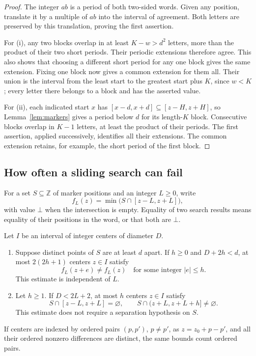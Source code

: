 \begin{proof}
The integer $ab$ is a period of both two-sided words.  Given any position,
translate it by a multiple of $ab$ into the interval of agreement.  Both
letters are preserved by this translation, proving the first assertion.

For (i), any two blocks overlap in at least $K-w>d^2$ letters, more than
the product of their two short periods.  Their periodic extensions
therefore agree.  This also shows that choosing a different short period
for any one block gives the same extension.  Fixing one block now gives
a common extension for them all.  Their union is the interval from the
least start to the greatest start plus $K$, since $w<K$; every letter
there belongs to a block and has the asserted value.

For (ii), each indicated start $x$ has
$[x-d,x+d]\subseteq[z-H,z+H]$, so Lemma~\ref{lem:markers} gives a period
below $d$ for its length-$K$ block.  Consecutive blocks overlap in $K-1$
letters, at least the product of their periods.  The first assertion,
applied successively, identifies all their extensions.  The common
extension retains, for example, the short period of the first block.
\end{proof}

\subsection{How often a sliding search can fail}

For a set $S\subseteq\mathbb Z$ of marker positions and an integer
$L\ge0$, write
\[
 f_L(z)=\min\bigl(S\cap[z-L,z+L]\bigr),
\]
with value $\bot$ when the intersection is empty.  Equality of two search
results means equality of their positions in the word, or that both are
$\bot$.

\begin{lemma}\label{lem:search-crossings}
Let $I$ be an interval of integer centers of diameter $D$.
\begin{enumerate}[label=\textnormal{(\roman*)}]
\item Suppose distinct points of $S$ are at least $d$ apart.  If $h\ge0$
and $D+2h<d$, at most $2(2h+1)$ centers $z\in I$ satisfy
\[
 f_L(z+e)\ne f_L(z)\quad\text{for some integer }|e|\le h.
\]
This estimate is independent of $L$.
\item Let $h\ge1$.  If $D<2L+2$, at most $h$ centers $z\in I$ satisfy
\[
 S\cap[z-L,z+L]=\varnothing,
 \qquad S\cap(z+L,z+L+h]\ne\varnothing.
\]
This estimate does not require a separation hypothesis on $S$.
\end{enumerate}
If centers are indexed by ordered pairs $(p,p')$, $p\ne p'$, as
$z=z_0+p-p'$, and all their ordered nonzero differences are distinct,
the same bounds count ordered pairs.
\end{lemma}

